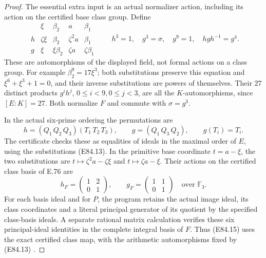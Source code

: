 \begin{proof}
The essential extra input is an actual normalizer action,
including its action on the certified base class group.
Define
\[
 \begin{array}{c|cc|cc}
       &\xi&\beta_2&a&\beta_1\\ \hline
 h&\zeta\xi&\beta_2&\zeta^2a&\beta_1\\
 g&\xi&\xi\beta_2&\zeta a&\zeta\beta_1
 \end{array}
 \qquad
 h^3=1,\quad g^3=\sigma,\quad g^9=1,\quad
 hgh^{-1}=g^4 .
 \tag{E84.13}
\]
These are automorphisms of the displayed field, not
formal actions on a class group. For example
\(\beta_2^9=17\xi^3\); both substitutions preserve this
equation and \(\xi^6+\xi^3+1=0\), and their inverse
substitutions are powers of themselves. Their \(27\)
distinct products \(g^i h^j\), \(0\le i<9,0\le j<3\),
are all the \(K\)-automorphisms, since \([E:K]=27\).
Both normalize \(F\) and commute with \(\sigma=g^3\).

In the actual six-prime ordering the permutations are
\[
 h=(Q_1\,Q_2\,Q_3)(T_1\,T_2\,T_3),
 \qquad
 g=(Q_1\,Q_3\,Q_2),\qquad g(T_i)=T_i.
 \tag{E84.14}
\]
The certificate checks these as equalities of ideals in
the maximal order of \(E\), using the substitutions
(E84.13). In the primitive base coordinate \(t=a-\xi\),
the two substitutions are
\(t\mapsto\zeta^2a-\zeta\xi\) and
\(t\mapsto\zeta a-\xi\). Their actions on the certified
class basis of E.76 are
\[
 h_F=
 \begin{pmatrix}1&2\\0&1\end{pmatrix},\qquad
 g_F=
 \begin{pmatrix}1&1\\0&1\end{pmatrix}
 \quad\text{over }\mathbb F_3.
 \tag{E84.15}
\]
For each basis ideal and for \(P\), the program retains
the actual image ideal, its class coordinates and a
literal principal generator of its quotient by the
specified class-basis ideals. A separate rational
matrix calculation verifies these six principal-ideal
identities in the complete integral basis of \(F\).
Thus (E84.15) uses the exact certified class map, with
the arithmetic automorphisms fixed by (E84.13)
\cite[entries \texttt{bnfisprincipal} and
\texttt{nfgaloisapply}]{E_PARICertifiedUnits}.


\end{proof}
